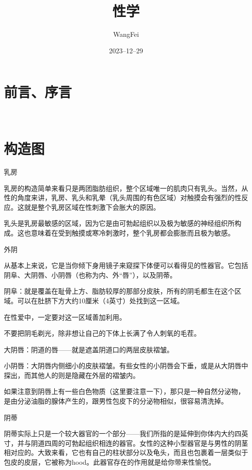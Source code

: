 \documentclass[12pt,UTF8]{ctexbook}
\title{\heiti\zihao{0} 性学}
\author{WangFei}
\date{2023--12--29}
\begin{document}
\maketitle
\tableofcontents

\frontmatter
\chapter{前言、序言}

\mainmatter

~\\

 \qquad  

\chapter{构造图}

乳房

乳房的构造简单来看只是两团脂肪组织，整个区域唯一的肌肉只有乳头。当然，从性的角度来讲，乳房、乳头和乳晕（乳头周围的有色区域）对触摸会有强烈的性反应。这就是整个乳房区域在性刺激下会胀大的原因。

乳头是乳房最敏感的区域，因为它是由可勃起组织以及极为敏感的神经组织所构成。这也意味着在受到触摸或寒冷刺激时，整个乳房都会膨胀而且极为敏感。

外阴

从基本上来说，它是当你倾下身用镜子来窥探下体便可以看得见的性器官。它包括阴阜、大阴唇、小阴唇（也称为内、外“唇”），以及阴蒂。

阴阜：就是覆盖在耻骨上方、脂肪较厚的那部分皮肤，所有的阴毛都生在这个区域。可以在肚脐下方大约10厘米（4英寸）处找到这一区域。

在性爱中，一定要对这一区域善加利用。

不要把阴毛剃光，除非想让自己的下体上长满了令人刺氧的毛茬。

大阴唇：阴道的唇——就是遮盖阴道口的两层皮肤褶皱。

小阴唇：大阴唇内侧细小的皮肤褶皱。有些女性的小阴唇会下垂，或是从大阴唇中探出，而其他人的则是隐藏在外层的褶皱内。

如果注意到阴唇上有一些白色物质（这里要注意一下），那只是一种自然分泌物，是由分泌油脂的腺体产生的，跟男性包皮下的分泌物相似，很容易清洗掉。

阴蒂

阴蒂实际上只是一个较大器官的一个部分——我们所指的是延伸到你体内大约四英寸，并与阴道四周的可勃起组织相连的器官。女性的这种小型器官是与男性的阴茎相对应的。大致来看，它也有自己的柱状部分以及龟头，而且也包裹着一层类似于包皮的皮层，它被称为hood。此器官存在的作用就是给你带来性愉悦。
\end{document}
